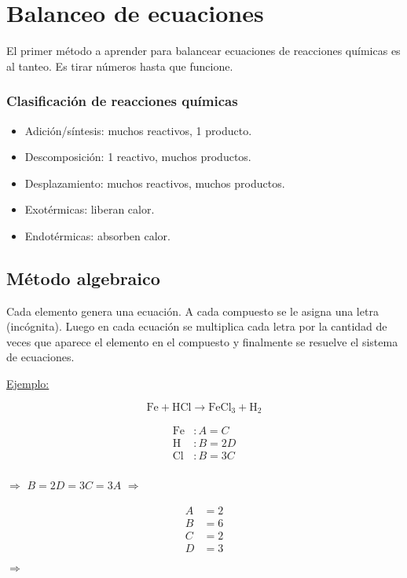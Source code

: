 \section{Balanceo de ecuaciones}

El primer método a aprender para balancear ecuaciones de reacciones químicas es al tanteo. Es tirar números hasta que funcione.

\subsubsection*{Clasificación de reacciones químicas}

\begin{itemize}
\item Adición/síntesis: muchos reactivos, 1 producto.

\item Descomposición: 1 reactivo, muchos productos.

\item Desplazamiento: muchos reactivos, muchos productos.

\item Exotérmicas: liberan calor.

\item Endotérmicas: absorben calor.
\end{itemize}

\subsection{Método algebraico}

Cada elemento genera una ecuación. A cada compuesto se le asigna una letra (incógnita). Luego en cada ecuación se multiplica cada letra por la cantidad de veces que aparece el elemento en el compuesto y finalmente se resuelve el sistema de ecuaciones.

\skipline
\underline{Ejemplo:}

$$\text{Fe} + \text{HCl} \longrightarrow \text{FeCl}_3 + \text{H}_2$$

\begin{minipage}[l]{0.2\textwidth}
\begin{align*}
\text{Fe}&: A = C\\
\text{H}&: B = 2D\\
\text{Cl}&: B = 3C\\
\;
\end{align*}
\end{minipage}
$\Longrightarrow$
\hfil
$B=2D=3C=3A$
\hfil
$\Longrightarrow$
\begin{minipage}[l]{0.1\textwidth}
\begin{align*}
A&= 2\\
B&= 6\\
C&= 2\\
D&= 3
\end{align*}
\end{minipage}
$\Longrightarrow$
\hfil 
{}
\hfil

